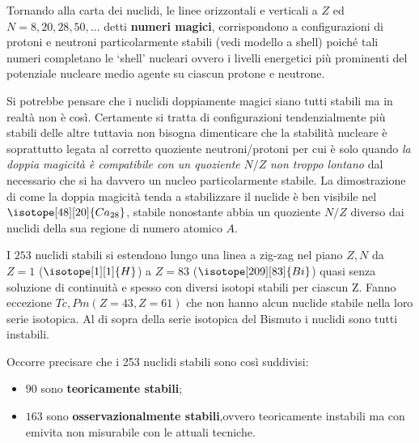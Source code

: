 Tornando alla carta dei nuclidi, le linee orizzontali e verticali a $Z$ ed $N = 8, 20, 28, 50, \dots$ detti \textbf{numeri magici},
corrispondono a configurazioni di protoni e neutroni particolarmente stabili (vedi modello a shell)
poiché tali numeri completano le `shell’ nucleari ovvero i livelli energetici più prominenti del potenziale nucleare
medio agente su ciascun protone e neutrone.

Si potrebbe pensare che i nuclidi doppiamente magici siano tutti stabili
ma in realtà non è così.
Certamente si tratta di configurazioni tendenzialmente più stabili delle altre tuttavia non bisogna dimenticare che
la stabilità nucleare è soprattutto legata al corretto quoziente
neutroni/protoni per cui è solo quando \emph{la doppia magicità è compatibile con
un quoziente} $N/Z$ \emph{non troppo lontano} dal necessario che si ha davvero un
nucleo particolarmente stabile.
La dimostrazione di come la doppia magicità tenda a stabilizzare il nuclide è ben visibile nel
$ \isotope[48][20]{\mathlarger{Ca}_{28}} $, stabile nonostante abbia un quoziente $N/Z$ diverso
dai nuclidi della sua regione di numero atomico $A$.

I $253$ nuclidi stabili si estendono lungo una linea a zig-zag nel piano $Z,N$ da $Z=1$ ($ \isotope[1][1]{\mathlarger{H}} $) 
a $Z=83$ ($ \isotope[209][83]{\mathlarger{Bi}} $) quasi senza soluzione di continuità e spesso con
diversi isotopi stabili per ciascun Z. Fanno eccezione $ Tc,Pm(Z=43,Z=61) $ che non hanno alcun nuclide stabile nella
loro serie isotopica.
Al di sopra della serie isotopica del Bismuto i nuclidi sono tutti instabili.

Occorre precisare che i 253 nuclidi stabili sono così suddivisi:
\begin{itemize}
    \item $ 90 $ sono \textbf{teoricamente stabili};
    \item $ 163 $ sono \textbf{osservazionalmente stabili},ovvero teoricamente instabili ma con emivita non misurabile
    con le attuali tecniche.
\end{itemize}

